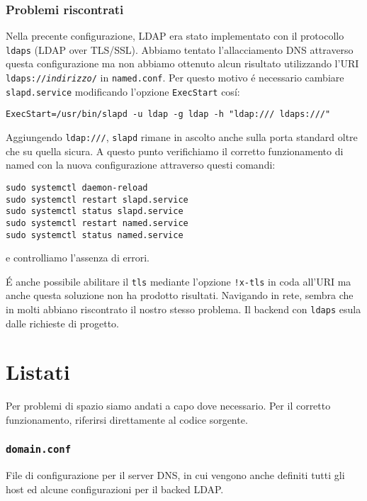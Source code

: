 \documentclass[9pt, a4paper, oneside]{article}
\begin{document}
		\section{Problemi riscontrati}
			\par
				Nella precente configurazione, LDAP era stato 
				implementato con il protocollo \texttt{ldaps} 
				(LDAP over TLS/SSL). Abbiamo tentato 
				l'allacciamento DNS attraverso questa 
				configurazione ma non abbiamo ottenuto alcun 
				risultato utilizzando l'URI 
				\texttt{ldaps://\emph{indirizzo}/} in 
				\texttt{named.conf}. 
				Per questo motivo \'e necessario cambiare 
				\texttt{slapd.service} modificando l'opzione 
				\texttt{ExecStart} cos\'i:
				\begin{verbatim}
ExecStart=/usr/bin/slapd -u ldap -g ldap -h "ldap:/// ldaps:///"
				\end{verbatim}
				Aggiungendo \texttt{ldap:///}, \texttt{slapd} 
				rimane in ascolto anche sulla porta standard 
	 			oltre che su quella sicura. A questo punto 
	 			verifichiamo il corretto funzionamento di named 
	 			con la nuova configurazione attraverso questi 
	 			comandi:
	 			\begin{verbatim}
sudo systemctl daemon-reload
sudo systemctl restart slapd.service
sudo systemctl status slapd.service
sudo systemctl restart named.service
sudo systemctl status named.service
	 			\end{verbatim}
	 			e controlliamo l'assenza di errori.
	 		\par
	 			\'E anche possibile 
	 			abilitare il \texttt{tls} mediante l'opzione 
	 			\texttt{!x-tls} in coda all'URI ma anche 
	 			questa soluzione non ha prodotto risultati. 
	 			Navigando in rete, sembra che in molti abbiano 
	 			riscontrato il nostro stesso problema. Il 
	 			backend con \texttt{ldaps} esula dalle 
	 			richieste di progetto.
		\newpage
	\part{Listati}
		\par
			Per problemi di spazio siamo andati a capo dove 
			necessario. Per il corretto funzionamento, riferirsi 
			direttamente al codice sorgente.
		\section{\texttt{domain.conf}}
			\par
				File di configurazione per il server DNS, in 
				cui vengono anche definiti tutti gli host ed 
				alcune configurazioni per il backed LDAP.
			\texttt{}
			\newpage
\end{document}
